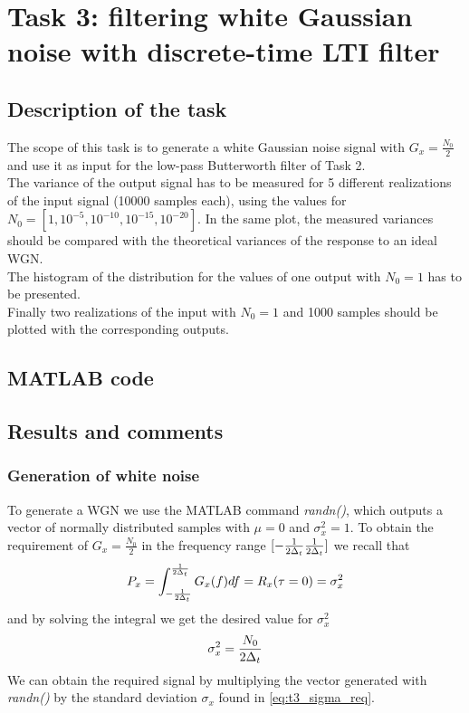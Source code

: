 

\graphicspath{{graphics/task3/}}
\chapter{Task 3: filtering white Gaussian noise with discrete-time LTI filter}
\section{Description of the task}
The scope of this task is to generate a white Gaussian noise signal with $G_x=\frac{N_0}{2}$ and use it as input for the low-pass Butterworth filter of Task 2.\\
The variance of the output signal has to be measured for 5 different realizations of the input signal (10000 samples each), using the values for $N_0=[1, 10^{-5}, 10^{-10}, 10^{-15}, 10^{-20}]$. In the same plot, the measured variances should be compared with the theoretical variances of the response to an ideal WGN.\\
The histogram of the distribution for the values of one output with $N_0=1$ has to be presented. \\
Finally two realizations of the input with $N_0=1$ and 1000 samples should be plotted with the corresponding outputs.
\section{MATLAB code}


\pagebreak
\section{Results and comments}
\subsection{Generation of white noise}
To generate a WGN we use the MATLAB command \textit{randn()}, which outputs a vector of normally distributed samples with $\mu=0$ and $\sigma^2_x=1$.
To obtain the requirement of $G_x=\frac{N_0}{2}$ in the frequency range $[-\frac{1}{2 \Delta_t} \frac{1}{2 \Delta_t}]$ we recall that
\begin{equation*}
P_x=\int_{-\frac{1}{2 \Delta_t}}^{\frac{1}{2 \Delta_t}} G_x(f)df = R_x(\tau=0)=\sigma^2_x
\end{equation*}
and by solving the integral we get the desired value for $\sigma^2_x$
\begin{equation}\label{eq:t3_sigma_req}
\sigma^2_x=\frac{N_0}{2 \Delta_t}
\end{equation}
We can obtain the required signal by multiplying the vector generated with \textit{randn()} by the standard deviation $\sigma_x$ found in \cref{eq:t3_sigma_req}.
